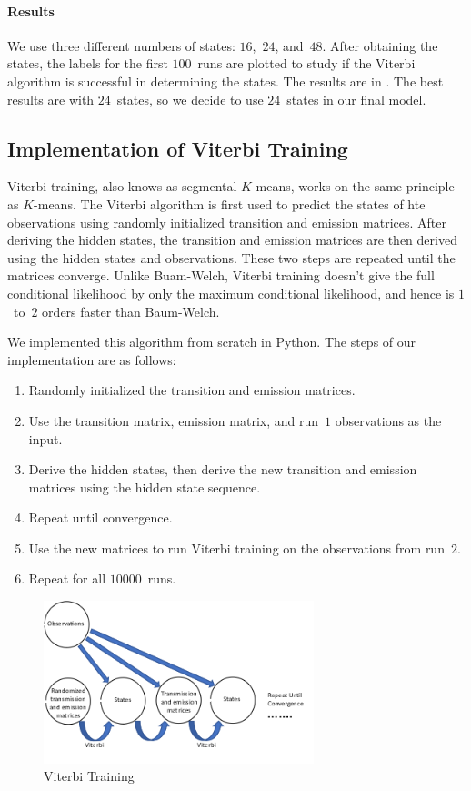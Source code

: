 \documentclass[twoside]{article}
\begin{document}
\paragraph{Results}

We use three different numbers of states: $16$,~$24$, and~$48$.
After obtaining the states, the labels for the first $100$~runs are plotted to study if the Viterbi algorithm is successful in determining the states.
The results are in . %
The best results are with $24$~states, so we decide to use $24$~states in our final model.

\subsection{Implementation of Viterbi Training}\label{sec:impl-viterbi-train}

Viterbi training, also knows as segmental $K$-means, works on the same principle as $K$-means.
The Viterbi algorithm is first used to predict the states of hte observations using randomly initialized transition and emission matrices.
After deriving the hidden states, the transition and emission matrices are then derived using the hidden states and observations.
These two steps are repeated until the matrices converge.
Unlike Buam-Welch, Viterbi training doesn't give the full conditional likelihood by only the maximum conditional likelihood, and hence is $1$~to~$2$ orders faster than Baum-Welch.

We implemented this algorithm from scratch in Python.
The steps of our implementation are as follows:
\begin{enumerate}
\item Randomly initialized the transition and emission matrices.
\item Use the transition matrix, emission matrix, and run~$1$ observations as the input.
\item Derive the hidden states, then derive the new transition and emission matrices using the hidden state sequence.
\item Repeat until convergence.
\item Use the new matrices to run Viterbi training on the observations from run~$2$.
\item Repeat for all $\num{10000}$~runs.
\end{enumerate}

\begin{figure}[h]
  \centering
  \includegraphics[width=0.7\textwidth]{images/viterbi-training}
  \caption{Viterbi Training}\label{fig:viterbi-training}
\end{figure}
\end{document}
